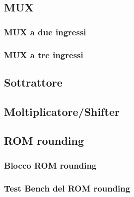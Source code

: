 


\subsection{MUX}

\subsubsection{MUX a due ingressi}



\subsubsection{MUX a tre ingressi}



\subsection{Sottrattore}



\subsection{Moltiplicatore/Shifter}



\subsection{ROM rounding}

\subsubsection{Blocco ROM rounding}



\subsubsection{Test Bench del ROM rounding}

